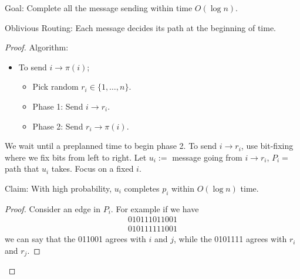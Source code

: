\documentclass{report}
\begin{document}
\noindent Goal: Complete all the message sending within time $O(\log n)$.

\noindent Oblivious Routing: Each message decides its path at the beginning of time. 

\begin{proof}
    Algorithm:
    \begin{itemize}
        \item To send $i \to \pi(i)$; 
        \begin{itemize}
            \item Pick random $r_i \in \{1, \ldots, n\}$.
            \item Phase 1: Send $i \to r_i$.
            \item Phase 2: Send $r_i \to \pi(i)$.
        \end{itemize}
    \end{itemize}
    We wait until a preplanned time to begin phase 2. To send $i \to r_i$, use bit-fixing where we fix bits from left to right. Let $u_i :=$ message going from $i \to r_i$, $P_i=$ path that $u_i$ takes. Focus on a fixed $i$. 

    \noindent Claim: With high probability, $u_i$ completes $p_i$ within $O(\log n)$ time. 

    \begin{proof}
        Consider an edge in $P_i$. For example if we have
        \begin{align*}
            010111011001 \\
            010111111001
        \end{align*}
        we can say that the 011001 agrees with $i$ and $j$, while the 0101111 agrees with $r_i$ and $r_j$. 


\end{proof}
\end{proof}
\end{document}
